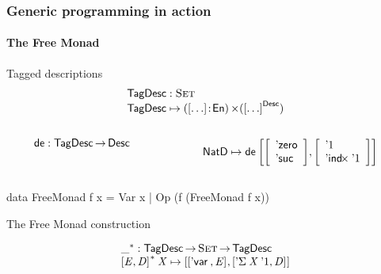 \documentclass{beamer}
\begin{document}
\begin{frame}
\end{frame}

\begin{frame}[fragile]

\frametitle{Generic programming in action}
\framesubtitle{The Free Monad}

\begin{block}{Tagged descriptions}
\[\stk{
 \TagDesc : \Set \\
 \TagDesc \mapsto \SIGMA{\sqr{\ldots}}{\EnumU} ({\sqr{\ldots}}^{\Desc}) \\
}\]
%
\begin{columns}
  \begin{column}{4cm}
\[
  \SYMBtoDesc : \TagDesc \To \Desc 
\]
  \end{column}
  \begin{column}{6cm}
\[
\NatD \mapsto \toDesc{\pair{\sqr{\begin{array}{l} 
                                   \NatZero\\
                                   \SYMBNatSuc
                                 \end{array}}}
                           {\sqr{\begin{array}{l}
                                   \DUnit \\
                                   \DIndx{\DUnit}
                                 \end{array}}}{}}
\]
  \end{column}
\end{columns}

\end{block}


\begin{center}
\begin{minipage}{8cm}
\begin{hcode}
data FreeMonad f x = Var x | Op (f (FreeMonad f x))
\end{hcode}
\end{minipage}
\end{center}



\newcommand{\FMFreeMonad}{\D{FreeMonad}}
\newcommand{\FMFreeMonadD}{\D{FreeMonadD}}
\newcommand{\FMVar}{\C{Var}}
\newcommand{\FMComposite}{\C{Composite}}

\vspace*{-0.5cm}
\begin{block}{The Free Monad construction}

\[\stk{
\FreeMonad{\_} : \TagDesc \To \Set \To \TagDesc \\
\FreeMonad{\pair{\V{E}}{\V{D}}{}}\:\V{X} \mapsto
    \pair{\pair{\DVar{}}{\V{E}}{}}
         {\pair{\DSigma{\V{X}}{\DUnit}}{\V{D}}{}}{}
}\]

\end{block}

\end{frame}
\end{document}
